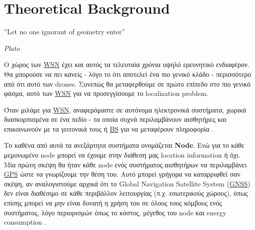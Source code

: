 \chapter{Theoretical Background} %
\label{chap:Chapter2} %
\epigraph{''Let no one ignorant of geometry enter” }{\textit{Plato}}

O χώρος των \hyperref[abbr:WSN]{WSN} έχει και αυτός τα τελευταία χρόνια υψηλό ερευνητικό ενδιαφέρον.
Θα μπορούσε να πει κανείς - λόγο το ότι αποτελεί ένα πιο γενικό κλάδο - περισσότερο από ότι αυτό των 
drones. Συνεπώς θα μεταφερθούμε σε πρώτο επίπεδο στο πιο γενικό φάσμα, αυτό των \hyperref[abbr:WSN]{WSN} 
για να προσεγγίσουμε το localization problem. 

Όταν μιλάμε για \hyperref[abbr:WSN]{WSN}, αναφερόμαστε σε αυτόνομα ηλεκτρονικά συστήματα, χωρικά διασκορπισμένα σε ένα πεδίο - τα οποία συχνά περιλαμβάνουν
αισθητήρες και επικοι\-νωνούν με τα γειτονικά τους ή \hyperref[abbr:BS]{BS} για να μεταφέρουν πληροφορία \cite{wsn-wikipedia} \cite{farooqiazam2016location}.

Το καθένα από αυτά τα ανεξάρτητα συστήματα ονομάζεται \textbf{Node}. Ενώ για το κάθε μεμονωμένο node 
μπορεί να έχουμε στην διάθεση μας location information ή όχι. 
Μία πρώτη σκέψη θα ήταν κάθε node ενός συστήματος αισθητήρων να περιλαμβάνει \hyperref[abbr:GPS]{GPS} ώστε να γνωρίζουμε 
την θέση του. Αυτό μπορεί γρήγορα να καταρριφθεί σαν σκέψη, αν αναλογιστούμε αρχικά ότι το Global Navigation Satellite System (\hyperref[abbr:GNSS]{GNSS})
δεν είναι διαθέσιμο σε κάθε περιβάλλον λειτουργίας (π.χ. εσωτερικούς χώρους), όπως επίσης μπορεί να μην είναι δυνατή η χρήση του σε όλους τους κόμβους
ενός συστήματος, λόγο περιορισμών όπως το κόστος, μέγεθος του node και energy consumption \cite{farooqiazam2016location}.   

\begin{table}[H]
    \caption{Nodes' names definitions}
    \label{tab:nodes-names-definition}
	\centering
\end{table}

